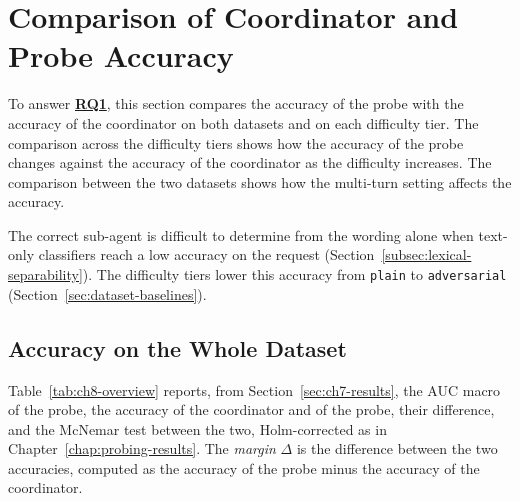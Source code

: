 \section{Comparison of Coordinator and Probe Accuracy}
\label{sec:ch8-overview}

\label{rq:ch8-rq1-intro}


\noindent To answer \hyperref[rq:ch8-rq1-intro]{\textbf{RQ1}}, this section compares the accuracy of the probe with the accuracy of the coordinator on both datasets and on each difficulty tier. The comparison across the difficulty tiers shows how the accuracy of the probe changes against the accuracy of the coordinator as the difficulty increases. The comparison between the two datasets shows how the multi-turn setting affects the accuracy.

The correct sub-agent is difficult to determine from the wording alone when text-only classifiers reach a low accuracy on the request (Section~\ref{subsec:lexical-separability}). The difficulty tiers lower this accuracy from \texttt{plain} to \texttt{adversarial} (Section~\ref{sec:dataset-baselines}).

\subsection{Accuracy on the Whole Dataset}
\label{subsec:ch8-overview-all}

Table~\ref{tab:ch8-overview} reports, from Section~\ref{sec:ch7-results}, the AUC macro of the probe, the accuracy of the coordinator and of the probe, their difference, and the McNemar test between the two, Holm-corrected as in Chapter~\ref{chap:probing-results}. The \emph{margin} $\Delta$ is the difference between the two accuracies, computed as the accuracy of the probe minus the accuracy of the coordinator.

